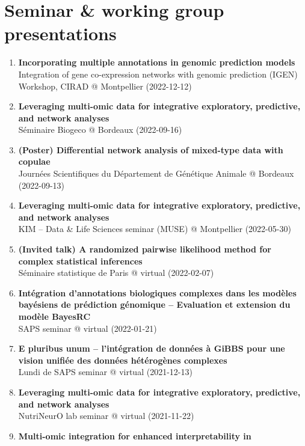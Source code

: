 \documentclass[11pt, a4paper]{awesome-cv}
\providecommand{\tightlist}{%
	\setlength{\itemsep}{0pt}\setlength{\parskip}{0pt}}
\begin{document}
\hypertarget{seminar-working-group-presentations}{%
\section{Seminar \& working group
presentations}\label{seminar-working-group-presentations}}

\begin{enumerate}
\def\labelenumi{\arabic{enumi}.}
\tightlist
\item
  \textbf{Incorporating multiple annotations in genomic prediction
  models}\\
  Integration of gene co-expression networks with genomic prediction
  (IGEN) Workshop, CIRAD @ Montpellier (2022-12-12)
\item
  \textbf{Leveraging multi-omic data for integrative exploratory,
  predictive, and network analyses}\\
  Séminaire Biogeco @ Bordeaux (2022-09-16)
\item
  \textbf{(Poster) Differential network analysis of mixed-type data with
  copulae}\\
  Journées Scientifiques du Département de Génétique Animale @ Bordeaux
  (2022-09-13)
\item
  \textbf{Leveraging multi-omic data for integrative exploratory,
  predictive, and network analyses}\\
  KIM -- Data \& Life Sciences seminar (MUSE) @ Montpellier (2022-05-30)
\item
  \textbf{(Invited talk) A randomized pairwise likelihood method for
  complex statistical inferences}\\
  Séminaire statistique de Paris @ virtual (2022-02-07)
\item
  \textbf{Intégration d'annotations biologiques complexes dans les
  modèles bayésiens de prédiction génomique -- Evaluation et extension
  du modèle BayesRC}\\
  SAPS seminar @ virtual (2022-01-21)
\item
  \textbf{E pluribus unum -- l'intégration de données à GiBBS pour une
  vision unifiée des données hétérogènes complexes}\\
  Lundi de SAPS seminar @ virtual (2021-12-13)
\item
  \textbf{Leveraging multi-omic data for integrative exploratory,
  predictive, and network analyses}\\
  NutriNeurO lab seminar @ virtual (2021-11-22)
\item
  \textbf{Multi-omic integration for enhanced interpretability in
}
\end{enumerate}
\end{document}
